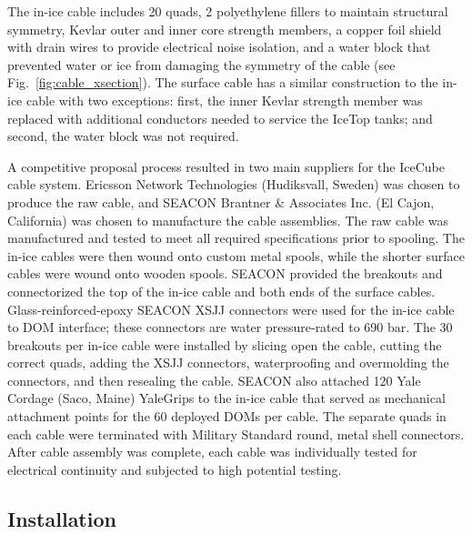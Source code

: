The in-ice cable includes 20 quads, 2 polyethylene fillers to maintain structural
symmetry, Kevlar outer and inner core strength members, a copper foil
shield with drain wires to provide electrical noise isolation, and a water
block that prevented water or ice from damaging the symmetry of the
cable (see Fig.~\ref{fig:cable_xsection}). The surface cable has a similar
construction to the in-ice 
cable with two exceptions: first, the inner Kevlar strength member was replaced
with additional conductors needed to service the IceTop tanks; and second, the
water block was not required.

A competitive proposal process resulted in two main suppliers for the IceCube
cable system.  Ericsson Network Technologies (Hudiksvall, Sweden) was chosen
to produce the raw cable, and SEACON Brantner \& Associates Inc. (El Cajon,
California) was chosen to manufacture the cable assemblies. The raw
cable was manufactured and tested to meet all required specifications prior to spooling.  The in-ice cables were then
wound onto custom metal spools, while the shorter surface cables were wound
onto wooden spools. SEACON provided the breakouts
and connectorized the top of the in-ice cable and both ends of the surface
cables. Glass-reinforced-epoxy SEACON XSJJ connectors were used for the in-ice
cable to DOM interface; these connectors are water pressure-rated to 690
bar. The 30 breakouts per in-ice cable were installed by 
slicing open the cable, cutting the correct quads, adding the
XSJJ connectors, waterproofing and overmolding the connectors, and then
resealing the cable. SEACON also
attached 120 Yale Cordage (Saco, Maine) YaleGrips to the in-ice
cable that served as mechanical attachment points for the 60 deployed DOMs
per cable. The separate quads in each cable were terminated with
Military Standard round,
metal shell connectors. After cable assembly was complete, 
each cable was individually tested for electrical continuity and subjected to high
potential testing. 

\subsection{Installation}

